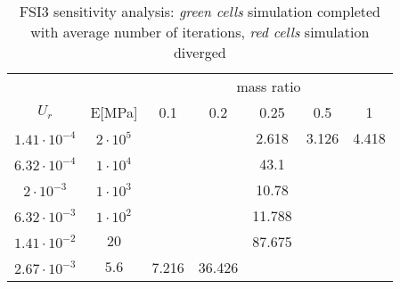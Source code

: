 \begin{table}[!htb]
	\begin{center}
		\begin{tabular}{ c | c | c c c c c} 
         &  & \multicolumn{5}{c}{mass ratio} \\
         
        $U_r$ & E[\si{MPa}] & 0.1 & 0.2 & 0.25 & 0.5 & 1 \\
        \hline
        
        $1.41\cdot 10^{-4}$ & $2\cdot 10^{5}$ & \cellcolor{green!10} & \cellcolor{green!10} & \cellcolor{green!10}2.618 & \cellcolor{green!10}3.126 & \cellcolor{green!10}4.418 \\
        $6.32\cdot 10^{-4}$ & $1\cdot 10^{4}$ & \cellcolor{green!10} & \cellcolor{green!10} & \cellcolor{green!10}43.1 & \cellcolor{red!10} & \cellcolor{red!10} \\        
        $2\cdot 10^{-3}$ & $1\cdot 10^{3}$ & \cellcolor{green!10} & \cellcolor{green!10} & \cellcolor{green!10}10.78 & \cellcolor{red!10} & \cellcolor{red!10} \\
        $6.32\cdot 10^{-3}$ & $1\cdot 10^{2}$ & \cellcolor{green!10} & \cellcolor{green!10} & \cellcolor{green!10}11.788 & \cellcolor{red!10} & \cellcolor{red!10} \\
        $1.41\cdot 10^{-2}$ & $20$ & \cellcolor{green!10} & \cellcolor{green!10} & \cellcolor{green!10}87.675 & \cellcolor{red!10} & \cellcolor{red!10} \\
        $2.67\cdot 10^{-3}$ & $5.6$ & \cellcolor{green!10}7.216 & \cellcolor{green!10}36.426 & \cellcolor{red!10} & \cellcolor{red!10} & \cellcolor{red!10} \\                        
 		\end{tabular}
	\end{center}
	\caption{FSI3 sensitivity analysis: \textit{green cells} simulation completed with average number of iterations, \textit{red cells} simulation diverged}
	\label{table:FSI3-sens}
\end{table}